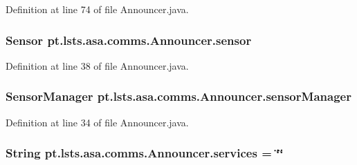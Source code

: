Definition at line 74 of file Announcer.\+java.

\hypertarget{classpt_1_1lsts_1_1asa_1_1comms_1_1Announcer_afab33815ef31c419af79ffc274c59030}{}
\subsubsection[{sensor}]{\setlength{\rightskip}{0pt plus 5cm}Sensor pt.\+lsts.\+asa.\+comms.\+Announcer.\+sensor\hspace{0.3cm}{\ttfamily [private]}}\label{classpt_1_1lsts_1_1asa_1_1comms_1_1Announcer_afab33815ef31c419af79ffc274c59030}


Definition at line 38 of file Announcer.\+java.

\hypertarget{classpt_1_1lsts_1_1asa_1_1comms_1_1Announcer_a78ba041e6948dffe1bf29e0f9eb74d5b}{}
\subsubsection[{sensor\+Manager}]{\setlength{\rightskip}{0pt plus 5cm}Sensor\+Manager pt.\+lsts.\+asa.\+comms.\+Announcer.\+sensor\+Manager\hspace{0.3cm}{\ttfamily [private]}}\label{classpt_1_1lsts_1_1asa_1_1comms_1_1Announcer_a78ba041e6948dffe1bf29e0f9eb74d5b}


Definition at line 34 of file Announcer.\+java.

\hypertarget{classpt_1_1lsts_1_1asa_1_1comms_1_1Announcer_ad98caa0827d953121f9ac5e8e79178b4}{}
\subsubsection[{services}]{\setlength{\rightskip}{0pt plus 5cm}String pt.\+lsts.\+asa.\+comms.\+Announcer.\+services = \char`\"{}\char`\"{}\hspace{0.3cm}{\ttfamily [private]}}\label{classpt_1_1lsts_1_1asa_1_1comms_1_1Announcer_ad98caa0827d953121f9ac5e8e79178b4}


